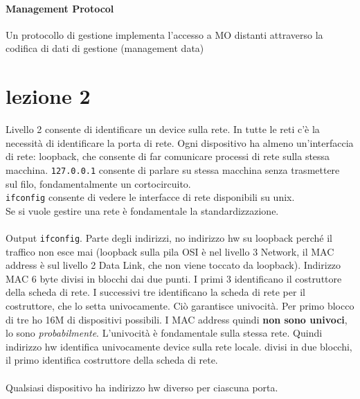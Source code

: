 \documentclass[10pt]{book}
\begin{document}
\paragraph{Management Protocol} Un protocollo di gestione implementa l'accesso a MO distanti attraverso la codifica di dati di gestione (management data)
\section{lezione 2}
Livello 2 consente di identificare un device sulla rete. In tutte le reti c'è la necessità di identificare la porta di rete. Ogni dispositivo ha almeno un'interfaccia di rete: loopback, che consente di far comunicare processi di rete sulla stessa macchina. \texttt{127.0.0.1} consente di parlare su stessa macchina senza trasmettere sul filo, fondamentalmente un cortocircuito.\\
\texttt{ifconfig} consente di vedere le interfacce di rete disponibili su unix.\\
Se si vuole gestire una rete è fondamentale la standardizzazione.\\\\
Output \texttt{ifconfig}. Parte degli indirizzi, no indirizzo hw su loopback perché il traffico non esce mai (loopback sulla pila OSI è nel livello 3 Network, il MAC address è sul livello 2 Data Link, che non viene toccato da loopback). Indirizzo MAC 6 byte divisi in blocchi dai due punti. I primi 3 identificano il costruttore della scheda di rete. I successivi tre identificano la scheda di rete per il costruttore, che lo setta univocamente. Ciò garantisce univocità. Per primo blocco di tre ho 16M di dispositivi possibili. I MAC address quindi \textbf{non sono univoci}, lo sono \textit{probabilmente}. L'univocità è fondamentale sulla stessa rete. Quindi indirizzo hw identifica univocamente device sulla rete locale. divisi in due blocchi, il primo identifica costruttore della scheda di rete.\\\\
Qualsiasi dispositivo ha indirizzo hw diverso per ciascuna porta.
\end{document}
